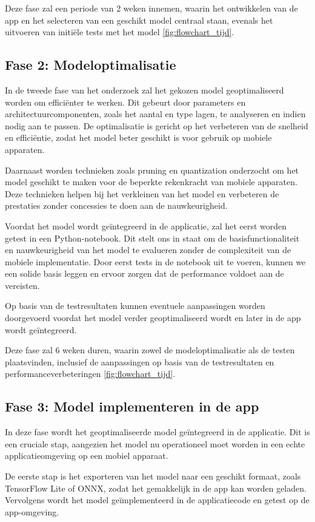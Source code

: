 Deze fase zal een periode van 2 weken innemen, waarin het ontwikkelen van de app en het selecteren van een geschikt model centraal staan, evenals het uitvoeren van initiële tests met het model \ref{fig:flowchart_tijd}.

\subsection{Fase 2: Modeloptimalisatie}
In de tweede fase van het onderzoek zal het gekozen model geoptimaliseerd worden om efficiënter te werken. 
Dit gebeurt door parameters en architectuurcomponenten, zoals het aantal en type lagen, te analyseren en indien nodig aan te passen. 
De optimalisatie is gericht op het verbeteren van de snelheid en efficiëntie, zodat het model beter geschikt is voor gebruik op mobiele apparaten.

Daarnaast worden technieken zoals pruning en quantization onderzocht om het model geschikt te maken voor de beperkte rekenkracht van mobiele apparaten. 
Deze technieken helpen bij het verkleinen van het model en verbeteren de prestaties zonder concessies te doen aan de nauwkeurigheid.

Voordat het model wordt geïntegreerd in de applicatie, zal het eerst worden getest in een Python-notebook. 
Dit stelt ons in staat om de basisfunctionaliteit en nauwkeurigheid van het model te evalueren zonder de complexiteit van de mobiele implementatie. 
Door eerst tests in de notebook uit te voeren, kunnen we een solide basis leggen en ervoor zorgen dat de performance voldoet aan de vereisten.

Op basis van de testresultaten kunnen eventuele aanpassingen worden doorgevoerd voordat het model verder geoptimaliseerd wordt en later in de app wordt geïntegreerd.

Deze fase zal 6 weken duren, waarin zowel de modeloptimalisatie als de testen plaatsvinden, inclusief de aanpassingen op basis van de testresultaten en performanceverbeteringen \ref{fig:flowchart_tijd}.

\subsection{Fase 3: Model implementeren in de app}
In deze fase wordt het geoptimaliseerde model geïntegreerd in de applicatie. 
Dit is een cruciale stap, aangezien het model nu operationeel moet worden in een echte applicatieomgeving op een mobiel apparaat.

De eerste stap is het exporteren van het model naar een geschikt formaat, zoals TensorFlow Lite of ONNX, zodat het gemakkelijk in de app kan worden geladen. 
Vervolgens wordt het model geïmplementeerd in de applicatiecode en getest op de app-omgeving.

